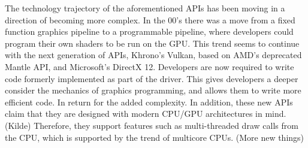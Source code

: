 The technology trajectory of the aforementioned APIs has been moving in a direction of becoming more complex. 
In the 00’s there was a move from a fixed function graphics pipeline to a programmable pipeline, where developers could program their own shaders to be run on the GPU.
This trend seems to continue with the next generation of APIs, Khrono’s Vulkan, based on AMD’s deprecated Mantle API, and Microsoft’s DirectX 12. 
Developers are now required to write code formerly implemented as part of the driver. 
This gives developers a deeper consider the mechanics of graphics programming, and allows them to write more efficient code.
In return for the added complexity.
In addition, these new APIs claim that they are designed with modern CPU/GPU architectures in mind. (Kilde)
Therefore, they support features such as multi-threaded draw calls from the CPU, which is supported by the trend of multicore CPUs. (More new things) 